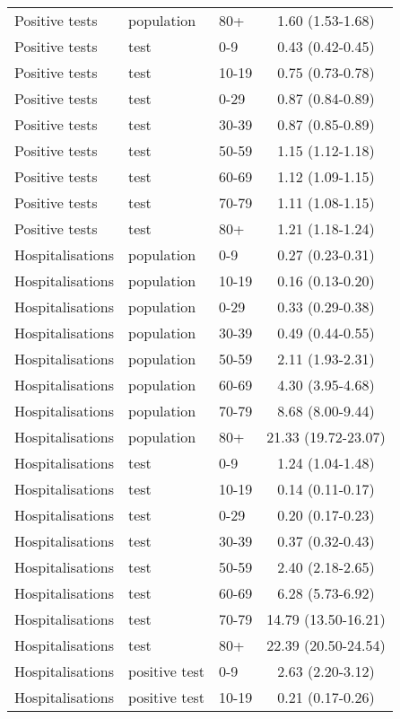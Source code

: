 \documentclass{article}
\begin{document}
\begin{longtable}{lllc}
			Positive tests & population & 80+ & 1.60 (1.53-1.68) \\ 
			Positive tests & test & 0-9 & 0.43 (0.42-0.45) \\ 
			Positive tests & test & 10-19 & 0.75 (0.73-0.78) \\ 
			Positive tests & test & 0-29 & 0.87 (0.84-0.89) \\ 
			Positive tests & test & 30-39 & 0.87 (0.85-0.89) \\ 
			Positive tests & test & 50-59 & 1.15 (1.12-1.18) \\ 
			Positive tests & test & 60-69 & 1.12 (1.09-1.15) \\ 
			Positive tests & test & 70-79 & 1.11 (1.08-1.15) \\ 
			Positive tests & test & 80+ & 1.21 (1.18-1.24) \\ 
			Hospitalisations & population & 0-9 & 0.27 (0.23-0.31) \\ 
			Hospitalisations & population & 10-19 & 0.16 (0.13-0.20) \\ 
			Hospitalisations & population & 0-29 & 0.33 (0.29-0.38) \\ 
			Hospitalisations & population & 30-39 & 0.49 (0.44-0.55) \\ 
			Hospitalisations & population & 50-59 & 2.11 (1.93-2.31) \\ 
			Hospitalisations & population & 60-69 & 4.30 (3.95-4.68) \\ 
			Hospitalisations & population & 70-79 & 8.68 (8.00-9.44) \\ 
			Hospitalisations & population & 80+ & 21.33 (19.72-23.07) \\ 
			Hospitalisations & test & 0-9 & 1.24 (1.04-1.48) \\ 
			Hospitalisations & test & 10-19 & 0.14 (0.11-0.17) \\ 
			Hospitalisations & test & 0-29 & 0.20 (0.17-0.23) \\ 
			Hospitalisations & test & 30-39 & 0.37 (0.32-0.43) \\ 
			Hospitalisations & test & 50-59 & 2.40 (2.18-2.65) \\ 
			Hospitalisations & test & 60-69 & 6.28 (5.73-6.92) \\ 
			Hospitalisations & test & 70-79 & 14.79 (13.50-16.21) \\ 
			Hospitalisations & test & 80+ & 22.39 (20.50-24.54) \\ 
			Hospitalisations & positive test & 0-9 & 2.63 (2.20-3.12) \\ 
			Hospitalisations & positive test & 10-19 & 0.21 (0.17-0.26) \\ 

\end{longtable}
\end{document}
